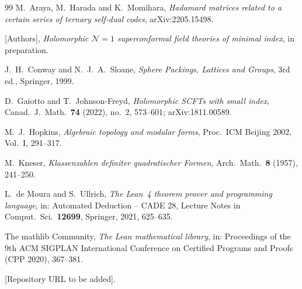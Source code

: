 \documentclass[11pt]{amsart}
\theoremstyle{definition}
\begin{document}
\begin{thebibliography}{99}
M.~Araya, M.~Harada and K.~Momihara,
\emph{Hadamard matrices related to a certain series of ternary self-dual codes},
arXiv:2205.15498.

[Authors], \emph{Holomorphic $\mathcal N=1$ superconformal field theories of minimal index},
in preparation.

J.~H.~Conway and N.~J.~A.~Sloane,
\emph{Sphere Packings, Lattices and Groups}, 3rd ed., Springer, 1999.

D.~Gaiotto and T.~Johnson-Freyd,
\emph{Holomorphic SCFTs with small index},
Canad.\ J.\ Math.\ \textbf{74} (2022), no.~2, 573--601; arXiv:1811.00589.

M.~J.~Hopkins,
\emph{Algebraic topology and modular forms},
Proc.\ ICM Beijing 2002, Vol.~I, 291--317.

M.~Kneser,
\emph{Klassenzahlen definiter quadratischer Formen},
Arch.\ Math.\ \textbf{8} (1957), 241--250.

L.~de Moura and S.~Ullrich,
\emph{The Lean~4 theorem prover and programming language},
in: Automated Deduction -- CADE 28, Lecture Notes in Comput.\ Sci.\ \textbf{12699}, Springer, 2021,
625--635.

The mathlib Community,
\emph{The Lean mathematical library},
in: Proceedings of the 9th ACM SIGPLAN International Conference on Certified Programs and Proofs
(CPP 2020), 367--381.

[Repository URL to be added].
\end{thebibliography}
\end{document}
